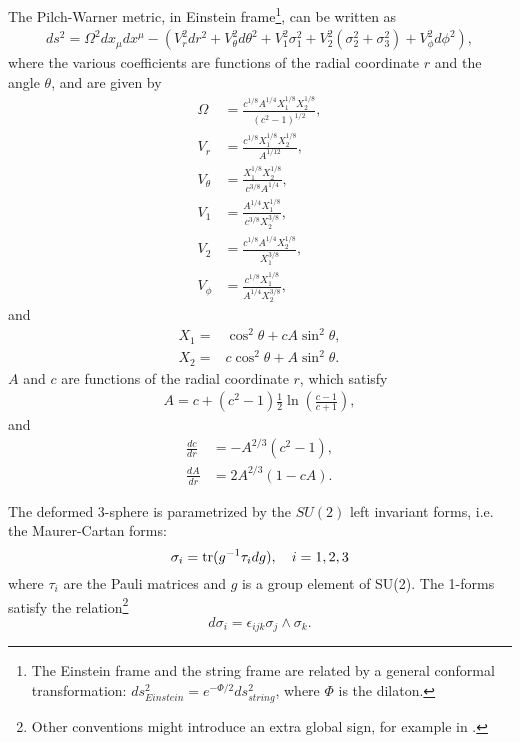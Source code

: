 The Pilch-Warner metric, in Einstein frame\footnote{The Einstein frame and the string frame are related by a general conformal transformation: $ds^2_{Einstein} = e^{-\Phi / 2} ds^2_{string}$, where $\Phi$ is the dilaton.}, can be written as \cite{Pilch:2003jg}
\begin{align}\label{eq:PWmetric}
ds^2 =
\Omega^2 dx_\mu dx^\mu -\left(
V_r^2 dr^2 + V_\theta^2 d\theta^2 + V_1^2 \sigma_1^2 + V_2^2 (\sigma_2^2 + \sigma_3^2) + V_\phi^2 d\phi^2\right),
\end{align}
where the various coefficients are functions of the radial coordinate $r$ and the angle $\theta$, and are given by
\begin{align}\label{eq:PWvielbeins}
\Omega &= \frac{c^{1/8} A^{1/4} X_1^{1/8} X_2^{1/8}}{(c^2 - 1)^{1/2}},\nonumber\\
V_r &= \frac{c^{1/8}X_1^{1/8} X_2^{1/8}}{A^{1/12}},\nonumber\\
V_\theta &= \frac{X_1^{1/8} X_2^{1/8}}{c^{3/8}A^{1/4}},\nonumber\\
V_1 &= \frac{A^{1/4}X_1^{1/8} }{c^{3/8}X_2^{3/8}},\nonumber\\
V_2 &= \frac{c^{1/8}A^{1/4}X_2^{1/8} }{X_1^{3/8}}, \nonumber\\
V_\phi &= \frac{c^{1/8}X_1^{1/8} }{A^{1/4}X_2^{3/8}},
\end{align}
and
\begin{align}
X_1 = & \cos^2\theta + cA  \sin^2\theta,\nonumber\\
X_2 = & c \cos^2\theta + A  \sin^2\theta.
\end{align}
$A$ and $c$ are functions of the radial coordinate $r$, which satisfy
\begin{align}
A = c+(c^2 -1)\frac{1}{2}\ln\left(\frac{c-1}{c+1}\right),
\end{align}
and
\begin{align}
\label{dcdr} \frac{dc}{dr} &= - A^{2/3}(c^2 - 1),\\ 
\label{dAdr} \frac{dA}{dr} &= 2 A^{2/3}\left(1 - c A\right).
\end{align}

The deformed 3-sphere is parametrized by the $SU(2)$ left invariant forms, i.e. the Maurer-Cartan forms:
\begin{equation}
\sigma_i = \mathop{\mathrm{tr}}(g^{-1}\tau_i d g), \quad i = 1,2,3
\end{equation}
where $\tau_i$ are the Pauli matrices and $g$ is a group element of SU(2). The 1-forms satisfy the relation\footnote{Other conventions might introduce an extra global sign, for example in \cite{Buchel:2000cn}.}
\begin{equation}
 d\sigma_i  = \epsilon_{i j k} \sigma_j \wedge \sigma_k.
\end{equation}




